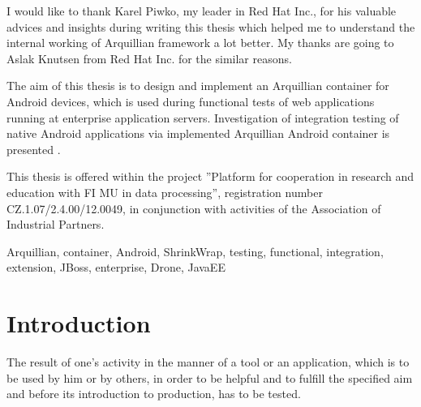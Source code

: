 \documentclass[12pt,final,oneside]{fithesis}
\begin{document}
\FrontMatter
\ThesisTitlePage

\begin{ThesisDeclaration}
\DeclarationText
\AdvisorName
\end{ThesisDeclaration}

\begin{ThesisThanks}
I would like to thank Karel Piwko, my leader in Red Hat Inc., for his valuable advices and insights during writing this thesis which helped me to understand the internal working of Arquillian framework a lot better. My thanks are going to Aslak Knutsen from Red Hat Inc. for the similar reasons.
\end{ThesisThanks}

\begin{ThesisAbstract}
The aim of this thesis is to design and implement an Arquillian container for Android devices, which is used during functional tests of web applications running at enterprise application servers. Investigation of integration testing of native Android applications via implemented Arquillian Android container is presented	.

This thesis is offered within the project ''Platform for cooperation in research and education with FI
MU in data processing'', registration number CZ.1.07/2.4.00/12.0049, in conjunction with activities of
the Association of Industrial Partners.
\end{ThesisAbstract}

\begin{ThesisKeyWords}
Arquillian, container, Android, ShrinkWrap, testing, functional, integration, extension, JBoss, enterprise, Drone, JavaEE
\end{ThesisKeyWords}

\clearpage
\thispagestyle{plain}
\par{}

\MainMatter
\tableofcontents

\chapter{Introduction}
The result of one's activity in the manner of a tool or an application, which is to be used by him or by others, in order to be helpful and to fulfill the specified aim and before its introduction to production, has to be tested.
\end{document}
